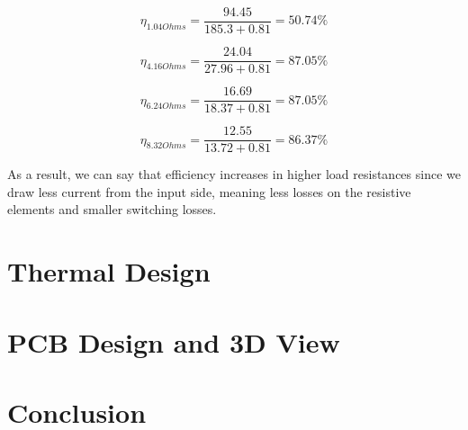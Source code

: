 \documentclass{article}
\newcommand\tab[1][1cm]{\hspace*{#1}}
\begin{document}
\begin{equation*}
    \eta_{1.04 Ohms}=\frac{94.45}{185.3+0.81}=50.74 \%
\end{equation*}

\begin{equation*}
    \eta_{4.16 Ohms}=\frac{24.04}{27.96+0.81}=87.05 \%
\end{equation*}

\begin{equation*}
    \eta_{6.24 Ohms}=\frac{16.69}{18.37+0.81}=87.05 \%
\end{equation*}

\begin{equation*}
    \eta_{8.32 Ohms}=\frac{12.55}{13.72+0.81}=86.37 \%
\end{equation*}

\tab As a result, we can say that efficiency increases in higher load resistances since we draw less current from the input side, meaning less losses on the resistive elements and smaller switching losses.

\section*{Thermal Design}

\section*{PCB Design and 3D View}

\section*{Conclusion}
\end{document}
